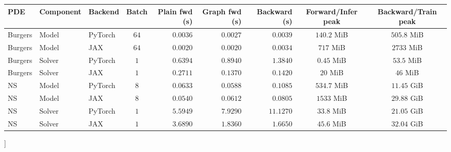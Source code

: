 ﻿\documentclass[letterpaper]{article} %
\begin{document}
\begin{center}
\footnotesize
{}
\label{tab:standalone_component_timing_memory}
\setlength{\tabcolsep}{2.1pt}
\begin{tabular}{lllcrrrcc}
\toprule
PDE & Component & Backend & Batch & Plain fwd (s) & Graph fwd (s) & Backward (s) & Forward/Infer peak & Backward/Train peak \\
\midrule
Burgers & Model & PyTorch & $64$ & $0.0036$ & $0.0027$ & $0.0039$ & $140.2$ MiB & $505.8$ MiB \\
Burgers & Model & JAX & $64$ & $0.0020$ & $0.0020$ & $0.0034$ & $717$ MiB & $2733$ MiB \\
Burgers & Solver & PyTorch & $1$ & $0.6394$ & $0.8940$ & $1.3840$ & $0.45$ MiB & $53.5$ MiB \\
Burgers & Solver & JAX & $1$ & $0.2711$ & $0.1370$ & $0.1420$ & $20$ MiB & $46$ MiB \\
NS & Model & PyTorch & $8$ & $0.0633$ & $0.0588$ & $0.1085$ & $534.7$ MiB & $11.45$ GiB \\
NS & Model & JAX & $8$ & $0.0540$ & $0.0612$ & $0.0805$ & $1533$ MiB & $29.88$ GiB \\
NS & Solver & PyTorch & $1$ & $5.5949$ & $7.9290$ & $11.1270$ & $33.8$ MiB & $21.05$ GiB \\
NS & Solver & JAX & $1$ & $3.6890$ & $1.8360$ & $1.6650$ & $45.6$ MiB & $32.04$ GiB \\
\bottomrule
\end{tabular}
\end{center}
\vspace{0.2em}
]
\end{document}
